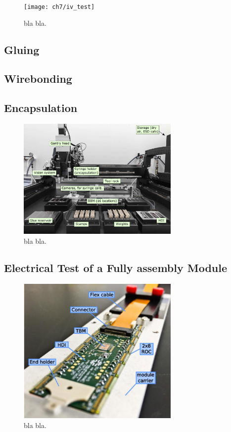 \begin{figure}[!h]
  \centering
  \texttt{[image: ch7/iv\_test]}
  \caption[bla for index.]{bla bla.}\label{fig:vis_insp}
\end{figure}

\subsection{Gluing}
\subsection{Wirebonding}
\subsection{Encapsulation}


\begin{figure}[!h]
  \centering
  \includegraphics[width=0.7\textwidth]{../images/ch7/gantry}
  \caption[bla for index.]{bla bla.}\label{fig:gantry}
\end{figure}



\subsection{Electrical Test of a Fully assembly Module}
\begin{figure}[!h]
  \centering
  \includegraphics[width=0.7\textwidth]{../images/ch7/fully_asem_mod}
  \caption[bla for index.]{bla bla.}\label{fig:fully_asem_mod}
\end{figure}

